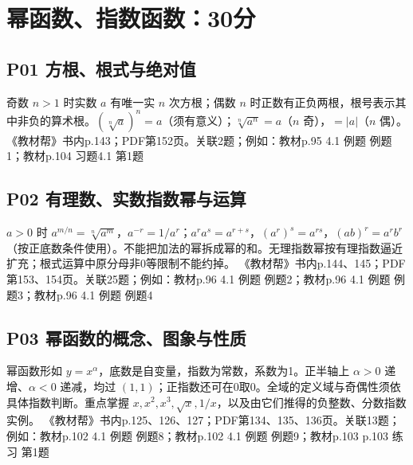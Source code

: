 \section{幂函数、指数函数：30分}
\par\medskip\noindent\begin{minipage}{\linewidth}\subsection{P01 方根、根式与绝对值}
奇数 $n>1$ 时实数 $a$ 有唯一实 $n$ 次方根；偶数 $n$ 时正数有正负两根，根号表示其中非负的算术根。$(\sqrt[n]a)^n=a$（须有意义）；$\sqrt[n]{a^n}=a$（$n$ 奇），$=|a|$（$n$ 偶）。
{\small 《教材帮》书内p.143；PDF第152页。关联2题；例如：教材p.95 4.1 例题 例题1；教材p.104 习题4.1 第1题}\par\end{minipage}\par
\par\medskip\noindent\begin{minipage}{\linewidth}\subsection{P02 有理数、实数指数幂与运算}
$a>0$ 时 $a^{m/n}=\sqrt[n]{a^m}$，$a^{-r}=1/a^r$；$a^ra^s=a^{r+s}$，$(a^r)^s=a^{rs}$，$(ab)^r=a^rb^r$（按正底数条件使用）。不能把加法的幂拆成幂的和。无理指数幂按有理指数逼近扩充；根式运算中原分母非0等限制不能约掉。
{\small 《教材帮》书内p.144、145；PDF第153、154页。关联25题；例如：教材p.96 4.1 例题 例题2；教材p.96 4.1 例题 例题3；教材p.96 4.1 例题 例题4}\par\end{minipage}\par
\par\medskip\noindent\begin{minipage}{\linewidth}\subsection{P03 幂函数的概念、图象与性质}
幂函数形如 $y=x^\alpha$，底数是自变量，指数为常数，系数为1。正半轴上 $\alpha>0$ 递增、$\alpha<0$ 递减，均过 $(1,1)$；正指数还可在0取0。全域的定义域与奇偶性须依具体指数判断。重点掌握 $x,x^2,x^3,\sqrt x,1/x$，以及由它们推得的负整数、分数指数实例。
{\small 《教材帮》书内p.125、126、127；PDF第134、135、136页。关联13题；例如：教材p.102 4.1 例题 例题8；教材p.102 4.1 例题 例题9；教材p.103 p.103 练习 第1题}\par\end{minipage}\par
